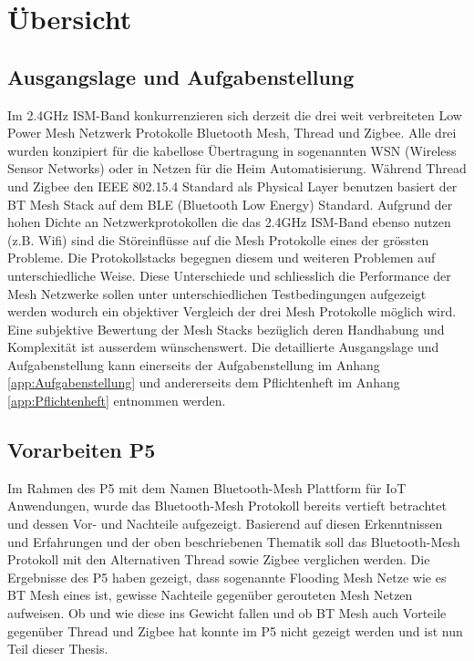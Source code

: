 \clearpage

\section{Übersicht}\label{sec:Uebersicht}

\subsection{Ausgangslage und Aufgabenstellung}\label{subsec:AusgangslageundAufgabenstellung}

Im 2.4GHz ISM-Band kon­kur­ren­zie­ren sich derzeit die drei weit verbreiteten Low Power Mesh Netzwerk Protokolle Bluetooth Mesh, Thread und Zigbee.
Alle drei wurden konzipiert für die kabellose Übertragung in sogenannten WSN (Wireless Sensor Networks) oder in Netzen für die Heim Automatisierung. Während Thread und Zigbee den IEEE 802.15.4 Standard als Physical Layer benutzen basiert der BT Mesh Stack auf dem BLE (Bluetooth Low Energy) Standard. Aufgrund der hohen Dichte an Netzwerkprotokollen die das 2.4GHz ISM-Band ebenso nutzen (z.B. Wifi) sind die Störeinflüsse auf die Mesh Protokolle eines der grössten Probleme. Die Protokollstacks begegnen diesem und weiteren Problemen auf unterschiedliche Weise. Diese Unterschiede und schliesslich die Performance der Mesh Netzwerke sollen unter unterschiedlichen Testbedingungen aufgezeigt werden wodurch ein objektiver Vergleich der drei Mesh Protokolle möglich wird. Eine subjektive Bewertung der Mesh Stacks bezüglich deren Handhabung und Komplexität ist ausserdem wünschenswert.
Die detaillierte Ausgangslage und Aufgabenstellung kann einerseits der Aufgabenstellung im Anhang \ref{app:Aufgabenstellung} und andererseits dem Pflichtenheft im Anhang \ref{app:Pflichtenheft} entnommen werden.

\subsection{Vorarbeiten P5}\label{subsec:VorarbeitenP5}

Im Rahmen des P5 mit dem Namen Bluetooth-Mesh Plattform für IoT Anwendungen, wurde das Bluetooth-Mesh Protokoll bereits vertieft betrachtet und dessen Vor- und Nachteile aufgezeigt. 
Basierend auf diesen Erkenntnissen und Erfahrungen und der oben beschriebenen Thematik soll das Bluetooth-Mesh Protokoll mit den Alternativen Thread sowie Zigbee verglichen werden.
Die Ergebnisse des P5 haben gezeigt, dass sogenannte Flooding Mesh Netze wie es BT Mesh eines ist, gewisse Nachteile gegenüber gerouteten Mesh Netzen aufweisen. Ob und wie diese ins Gewicht fallen und ob BT Mesh auch Vorteile gegenüber Thread und Zigbee hat konnte im P5 nicht gezeigt werden und ist nun Teil dieser Thesis.

